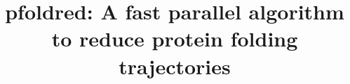 \documentclass[twocolumn]{bmcart}%
\begin{document}
\begin{frontmatter}

\begin{fmbox}


\title{pfoldred: A fast parallel algorithm to reduce protein folding trajectories}


	\author[
		 addressref={aff1},                   %
		 email={lgarreta@agrosavia.co}   %
	]{ }
	\author[
		 addressref={aff2},
		 email={mmartinez@ebi.ac.uk}
	]{ }
	\author[
		 addressref={aff3},
		 email={nediaz@unicauca.edu.co}
	]{ }
	\author[
		 addressref={aff4},
		 corref={aff4},                       %
		 email={pedro.moreno@correounivalle.edu.co}
	]{ }


\end{fmbox}
\end{frontmatter}
\end{document}
